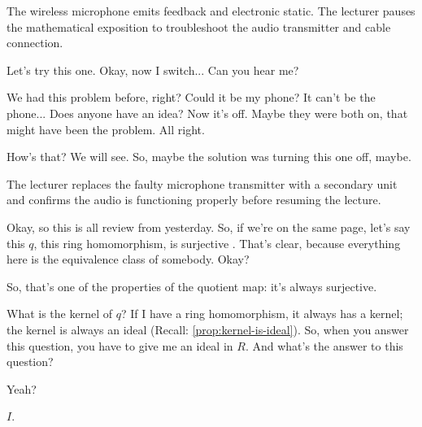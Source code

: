 \begin{note}
The wireless microphone emits feedback and electronic static. The lecturer pauses the mathematical exposition to troubleshoot the audio transmitter and cable connection.
\end{note}

\begin{speech}[00:04:21 - 00:05:34]
Let's try this one.  Okay, now I switch... Can you hear me?

We had this problem before, right? Could it be my phone? It can't be the phone...  Does anyone have an idea? Now it's off. Maybe they were both on, that might have been the problem. All right.

How's that? We will see. So, maybe the solution was turning this one off, maybe.
\end{speech}

\begin{note}
The lecturer replaces the faulty microphone transmitter with a secondary unit and confirms the audio is functioning properly before resuming the lecture.
\end{note}

\begin{speech}[00:05:35 - 00:06:17]
Okay, so this is all review from yesterday. So, if we're on the same page, let's say this $q$, this ring homomorphism, is surjective . That's clear, because everything here is the equivalence class of somebody. Okay?

So, that's one of the properties of the quotient map: it's always surjective.

What is the kernel of $q$?  If I have a ring homomorphism, it always has a kernel; the kernel is always an ideal (Recall: \cref{prop:kernel-is-ideal}). So, when you answer this question, you have to give me an ideal in $R$. And what's the answer to this question?

Yeah?
\end{speech}

\begin{student}
$I$.
\end{student}

